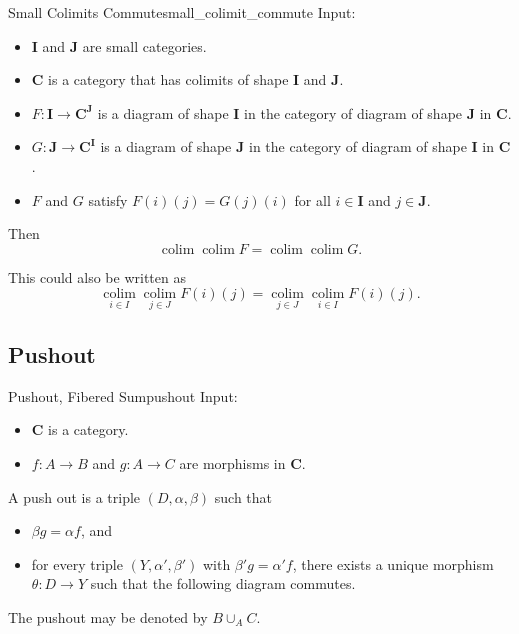 \documentclass{article}
\begin{document}
\begin{theorem}{Small Colimits Commute}{small_colimit_commute}
    Input:
    \begin{itemize}
        \item $\mathbf{I}$ and $\mathbf{J}$ are small categories.
        \item $\mathbf{C}$ is a category that has colimits of shape $\mathbf{I}$ and $\mathbf{J}$.
        \item $F: \mathbf{I} \rightarrow \mathbf{C}^\mathbf{J}$ is a diagram of shape $\mathbf{I}$ in the category of diagram of shape $\mathbf{J}$ in $\mathbf{C}$.
        \item $G: \mathbf{J} \rightarrow \mathbf{C}^\mathbf{I}$ is a diagram of shape $\mathbf{J}$ in the category of diagram of shape $\mathbf{I}$ in $\mathbf{C}$.
        \item $F$ and $G$ satisfy $F(i)(j) = G(j)(i)$ for all $i\in \mathbf{I}$ and $j\in\mathbf{J}$.
    \end{itemize}
    Then
    \[ \operatorname*{colim} \operatorname*{colim} F = \operatorname*{colim} \operatorname*{colim} G. \]
\end{theorem}
This could also be written as
\[ \operatorname*{colim}_{i\in I} \operatorname*{colim}_{j\in J} F(i)(j) = \operatorname*{colim}_{j\in J} \operatorname*{colim}_{i\in I} F(i)(j). \]

\subsection{Pushout}

\begin{definition}{Pushout, Fibered Sum}{pushout}
    Input:
    \begin{itemize}
        \item $\mathbf{C}$ is a category.
        \item $f:A\rightarrow B$ and $g:A\rightarrow C$ are morphisms in $\mathbf{C}$.
    \end{itemize}
    A push out is a triple $(D,\alpha,\beta)$ such that
    \begin{itemize}
        \item $\beta g = \alpha f$, and
        \item for every triple $(Y,\alpha',\beta')$ with $\beta' g = \alpha' f$, there exists a unique morphism $\theta:D\rightarrow Y$ such that the following diagram commutes.
        \begin{center}
        \end{center}
    \end{itemize}
    The pushout may be denoted by $B\cup_A C$.
\end{definition}
\end{document}
